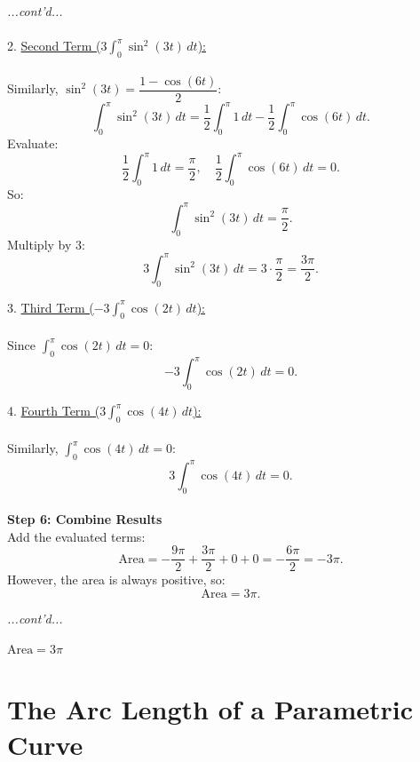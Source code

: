 \documentclass{article}
\begin{document}
\begin{exercisebox}
    \begin{solutionbox}
        \textit{...cont'd...} \\
        \\
        2. \underline{Second Term (\(3\int_{0}^{\pi} \sin^2(3t) \, dt\)):} \\
        \\
       Similarly, \( \sin^2(3t) = \dfrac{1 - \cos(6t)}{2} \):
       \[
           \int_{0}^{\pi} \sin^2(3t) \, dt = \frac{1}{2} \int_{0}^{\pi} 1 \, dt - \frac{1}{2} \int_{0}^{\pi} \cos(6t) \, dt.
       \]
       Evaluate:
       \[
           \frac{1}{2} \int_{0}^{\pi} 1 \, dt = \frac{\pi}{2}, \quad \frac{1}{2} \int_{0}^{\pi} \cos(6t) \, dt = 0.
       \]
       So:
       \[
           \int_{0}^{\pi} \sin^2(3t) \, dt = \frac{\pi}{2}.
       \]
       Multiply by 3:
       \[
           3\int_{0}^{\pi} \sin^2(3t) \, dt = 3 \cdot \frac{\pi}{2} = \frac{3\pi}{2}.
       \]

    3. \underline{Third Term (\(-3\int_{0}^{\pi} \cos(2t) \, dt\)):} \\
    \\
       Since \(\int_{0}^{\pi} \cos(2t) \, dt = 0\):
       \[
           -3\int_{0}^{\pi} \cos(2t) \, dt = 0.
       \]

    4. \underline{Fourth Term (\(3\int_{0}^{\pi} \cos(4t) \, dt\)):} \\
    \\
       Similarly, \(\int_{0}^{\pi} \cos(4t) \, dt = 0\):
       \[
           3\int_{0}^{\pi} \cos(4t) \, dt = 0.
       \]
    \\
    \textbf{Step 6: Combine Results} \\
    Add the evaluated terms:
    \[
        \text{Area} = -\frac{9\pi}{2} + \frac{3\pi}{2} + 0 + 0 = -\frac{6\pi}{2} = -3\pi.
    \]
    However, the area is always positive, so:
    \[
        \text{Area} = 3\pi.
    \]
    \end{solutionbox}
\end{exercisebox}
\begin{exercisebox}
    \begin{solutionbox}
        \textit{...cont'd...}
        \begin{answerbox}
            \( \text{Area} = 3\pi \)
        \end{answerbox}
    \end{solutionbox}
\end{exercisebox}

\section*{The Arc Length of a Parametric Curve}
\end{document}
